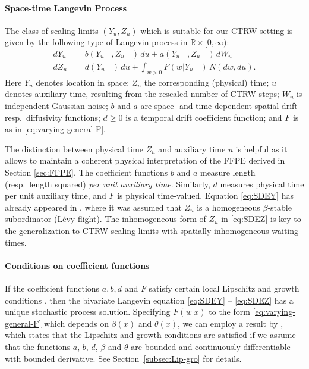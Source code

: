 \documentclass[a4paper,12pt]{elsarticle}
\numberwithin{equation}{section}
\theoremstyle{plain}
\theoremstyle{definition}
\theoremstyle{remark}
\numberwithin{equation}{section}
\newcommand{\spc}{\mathbb R}
\newcommand{\spctim}{\spc \times [0,\infty)}
\newcommand{\1}{\mathbf 1}
\begin{document}
\paragraph{Space-time Langevin Process}
The class of scaling limits $(Y_u, Z_u)$ which is suitable for our CTRW setting 
is given by the following type of Langevin process in $\spctim$: 
\begin{align} \label{eq:SDEY}
dY_u &= b(Y_{u-}, Z_{u-})\,du + a(Y_{u-}, Z_{u-})\, dW_u \\
\label{eq:SDEZ}
dZ_u &= d(Y_{u-})\,du + \int_{w > 0} F(w | Y_{u-}) \, N(dw, du).
\end{align}
Here $Y_u$ denotes location in space; $Z_u$ the corresponding (physical) time;
$u$ denotes auxiliary time, resulting from the rescaled number of CTRW steps;
$W_u$ is independent Gaussian noise; $b$ and $a$ are space- and time-dependent
spatial drift resp.\ diffusivity functions; $d \ge 0$ is a temporal drift coefficient function;
and $F$ is as in \eqref{eq:varying-general-F}.

The distinction between physical time $Z_u$ and auxiliary time $u$ is helpful
as it allows to maintain a coherent physical interpretation of the FFPE derived
in Section \ref{sec:FFPE}.  The coefficient functions $b$ and $a$ measure
length (resp.\ length squared) \emph{per unit auxiliary time}.  Similarly,
$d$ measures physical time per unit auxiliary time, and $F$ is physical
time-valued.
Equation \eqref{eq:SDEY} has already appeared in \cite{Weron2008}, where
it was assumed that $Z_u$ is a homogeneous $\beta$-stable subordinator (L\'evy
flight).
The inhomogeneous form of $Z_u$ in \eqref{eq:SDEZ} is key to the generalization
to CTRW scaling limits with spatially inhomogeneous waiting times.



\paragraph{Conditions on coefficient functions}
If the coefficient functions $a, b, d$ and $F$ satisfy certain local 
Lipschitz and growth conditions \cite[Chapter 6]{Applebaum}, then the bivariate
Langevin equation \eqref{eq:SDEY} -- \eqref{eq:SDEZ} has a unique stochastic 
process solution.  Specifying $F(w|x)$ to the form \eqref{eq:varying-general-F} which depends on 
$\beta(x)$ and $\theta(x)$, we can employ a result by \cite{Tsuchiya1992}, 
which states that the Lipschitz and growth conditions are 
satisfied if we assume that the functions $a$, $b$, $d$, $\beta$ and $\theta$ 
are bounded and continuously differentiable with bounded derivative.
See Section~\ref{subsec:Lip-gro} for details.
\end{document}
